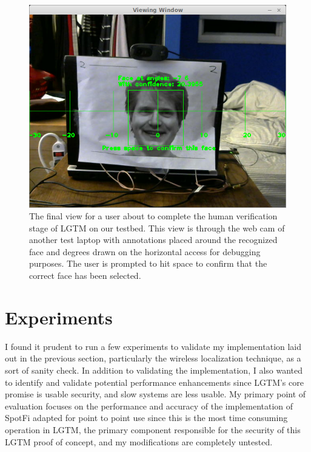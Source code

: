 \documentclass[12pt]{report}
\begin{document}
\begin{figure}[!htb]
    \begin{center}
        \caption{The final view for a user about to complete the human verification stage of LGTM on our testbed. This view is through the web cam of another test laptop with annotations placed around the recognized face and degrees drawn on the horizontal access for debugging purposes. The user is prompted to hit space to confirm that the correct face has been selected.}
        \label{figure: lgtm-confirmation}
        \includegraphics[scale=0.5]{../images/lgtm-confirmation.png}
    \end{center}
\end{figure}




\chapter{Experiments}
I found it prudent to run a few experiments to validate my implementation laid out in the previous section, particularly the wireless localization technique, as a sort of sanity check. In addition to validating the implementation, I also wanted to identify and validate potential performance enhancements since LGTM's core promise is usable security, and slow systems are less usable. My primary point of evaluation focuses on the performance and accuracy of the implementation of SpotFi adapted for point to point use since this is the most time consuming operation in LGTM, the primary component responsible for the security of this LGTM proof of concept, and my modifications are completely untested. \par
\end{document}
